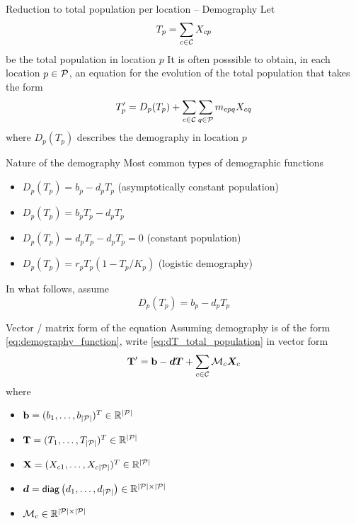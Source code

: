 \documentclass[aspectratio=169]{beamer}\usepackage[]{graphicx}\usepackage[]{xcolor}
\begin{document}
\begin{frame}{Reduction to total population per location -- Demography}
Let 
\[
	T_p = \sum_{c\in\C}X_{cp}
\]
be the total population in location $p$
\vfill
It is often posssible to obtain, in each location $p\in\P$, an equation for the evolution of the total population that takes the form
\begin{equation}\label{eq:dT_total_population}
	T_p' = 
	D_p(T_p)+\sum_{c\in\C}\sum_{q\in\P}m_{cpq}X_{cq}
\end{equation}
where $D_p(T_p)$ describes the demography in location $p$
\end{frame}

\begin{frame}{Nature of the demography}
	Most common types of demographic functions
	\begin{itemize}
		\item $D_p(T_p)=b_p-d_pT_p$ (asymptotically constant population)
		\item $D_p(T_p)=b_pT_p-d_pT_p$ 
		\item $D_p(T_p)=d_pT_p-d_pT_p=0$ (constant population)
		\item $D_p(T_p)=r_pT_p(1-T_p/K_p)$ (logistic demography)
	\end{itemize}
	\vfill
	In what follows, assume 
	\begin{equation}\label{eq:demography_function}
		D_p(T_p)=b_p-d_pT_p
	\end{equation}
\end{frame}

\begin{frame}{Vector / matrix form of the equation}
Assuming demography is of the form \eqref{eq:demography_function}, write \eqref{eq:dT_total_population} in vector form
\begin{equation}\label{sys:dN_general} 
	\mathbf{T}'=\mathbf{b}-\bd\bT+\sum_{c\in\C}\mathcal{M}_c\bX_{c}	
\end{equation}
where 
\begin{itemize}
	\item $\mathbf{b}=(b_1,\ldots,b_{|\mathcal{P}|})^T\in\IR^{|\P|}$
	\item $\mathbf{T}=(T_1,\ldots,T_{|\mathcal{P}|})^T\in\IR^{|\P|}$
	\item $\mathbf{X}=(X_{c1},\ldots,X_{c{|\mathcal{P}|}})^T\in\IR^{|\P|}$
	\item $\bd=\mathsf{diag}\left(d_1,\ldots,d_{|\mathcal{P}|}\right)\in\IR^{|\mathcal{P}|\times|\mathcal{P}|}$
	\item $\mathcal{M}_c\in\IR^{|\mathcal{P}|\times|\mathcal{P}|}$
\end{itemize}

\end{frame}
\end{document}
